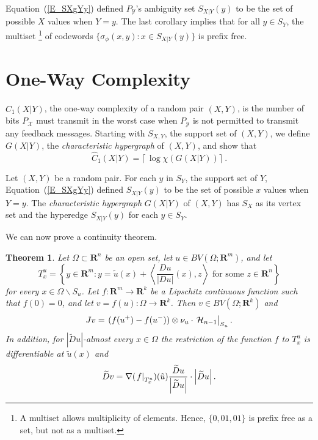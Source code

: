 \documentclass{article}
\newtheorem{thm}{Theorem}[section]
\theoremstyle{definition}
\theoremstyle{remark}
\newcommand{\st}{\sigma}
\newcommand{\XcY}{{(X,Y)}}
\newcommand{\SX}{{S_X}}
\newcommand{\SY}{{S_Y}}
\newcommand{\SXY}{{S_{X,Y}}}
\newcommand{\SXgYy}{{S_{X|Y}(y)}}
\newcommand{\Cw}[1]{{\hat C_#1(X|Y)}}
\newcommand{\G}{{G(X|Y)}}
\newcommand{\PY}{{P_{\mathcal{Y}}}}
\newcommand{\X}{\mathcal{X}}
\newcommand{\wt}{\widetilde}
\newcommand{\eval}[2][\right]{\relax
  \ifx#1\right\relax \left.\fi#2#1\rvert}
\newcommand{\envert}[1]{\left\lvert#1\right\rvert}
\let\abs=\envert
\begin{document}
Equation~(\ref{E_SXgYy}) defined $\PY$'s ambiguity set $\SXgYy$
to be the set of possible $X$ values when $Y=y$.
The last corollary implies that for all $y\in\SY$,
the multiset%
\footnote{A multiset allows multiplicity of elements.
Hence, $\{0,01,01\}$ is prefix free as a set, but not as a multiset.}
of codewords $\{\st_\phi(x,y):x\in\SXgYy\}$ is prefix free.

\section{One-Way Complexity}
\label{S_Cp1}

$\Cw1$, the one-way complexity of a random pair $\XcY$,
is the number of bits $P_\X$ must transmit in the worst case
when $\PY$ is not permitted to transmit any feedback messages.
Starting with $\SXY$, the support set of $\XcY$, we define $\G$,
the \textit{characteristic hypergraph} of $\XcY$, and show that
\[
\Cw1=\lceil\,\log\chi(\G)\rceil\ .
\]

Let $\XcY$ be a random pair. For each $y$ in $\SY$, the support set of
$Y$, Equation~(\ref{E_SXgYy}) defined $\SXgYy$ to be the set of possible
$x$ values when $Y=y$. The \textit{characteristic hypergraph} $\G$ of
$\XcY$ has $\SX$ as its vertex set and the hyperedge $\SXgYy$ for each
$y\in\SY$.


We can now prove a continuity theorem.
\begin{thm}\label{t:conl}
Let $\Omega \subset\mathbf{R}^n$ be an open set, let
$u\in BV(\Omega ;\mathbf{R}^m)$, and let
\begin{equation}\label{quts}
T^u_x=\left\{y\in\mathbf{R}^m:
 y=\tilde u(x)+\left\langle \frac{Du}{\abs{Du}}(x),z
\right\rangle \text{ for some }z\in\mathbf{R}^n\right\}
\end{equation}
for every $x\in\Omega \backslash S_u$. Let $f\colon \mathbf{R}^m\to
\mathbf{R}^k$ be a Lipschitz continuous function such that $f(0)=0$, and
let $v=f(u)\colon \Omega \to \mathbf{R}^k$. Then $v\in BV(\Omega
;\mathbf{R}^k)$ and
\begin{equation}
Jv=\eval{(f(u^+)-f(u^-))\otimes \nu_u\cdot\,
\mathcal{H}_{n-1}}_{S_u}.
\end{equation}
In addition, for $\abs{\wt{D}u}$-almost every $x\in\Omega $ the
restriction of the function $f$ to $T^u_x$ is differentiable at $\tilde
u(x)$ and
\begin{equation}
\wt{D}v=\nabla (\eval{f}_{T^u_x})(\tilde u)
\frac{\wt{D}u}{\abs{\wt{D}u}}\cdot\abs{\wt{D}u}.\end{equation}
\end{thm}
\end{document}
